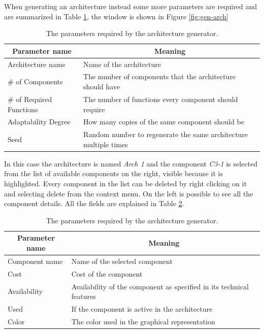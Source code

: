 When generating an architecture instead some more parameters are required and are summarized in Table \ref{tab:gen-parameters}, the window is shown in Figure \ref{fig:gen-arch}

\begin{table}[ht!b]
	\centering
	\begin{tabular}{|l|l|}
		\hline
		\multicolumn{1}{|c|}{Parameter name} & \multicolumn{1}{c|}{Meaning} \\
		\hline 
		Architecture name & Name of the architecture \\
		\hline
		\# of Components & The number of components that the architecture should have \\
		\hline
		\# of Required Functions & The number of functions every component should require \\
		\hline
		Adaptability Degree & How many copies of the same component should be \\
		\hline
		Seed & Random number to regenerate the same architecture multiple times \\
		\hline
		
	\end{tabular} 
	\caption[Generator parameters]{The parameters required by the architecture generator.}
	\label{tab:gen-parameters}
\end{table}

In this case the architecture is named \emph{Arch 1} and the component \emph{C3-1} is selected from the list of available components on the right, visible because it is highlighted. Every component in the list can be deleted by right clicking on it and selecting delete from the context menu. On the left is possible to see all the component details. All the fields are explained in Table \ref{tab:comp-details}.

\begin{table}[ht!b]
	\centering
	\begin{tabular}{|l|l|}
		\hline
		\multicolumn{1}{|c|}{Parameter name} & \multicolumn{1}{c|}{Meaning} \\
		\hline 
		Component name & Name of the selected component \\
		\hline
		Cost & Cost of the component \\
		\hline
		Availability & Availability of the component as specified in its technical features\\
		\hline
		Used & If the component is active in the architecture \\
		\hline
		Color & The color used in the graphical representation \\
		\hline
		
	\end{tabular} 
	\caption[Generator parameters]{The parameters required by the architecture generator.}
	\label{tab:comp-details}
\end{table}

